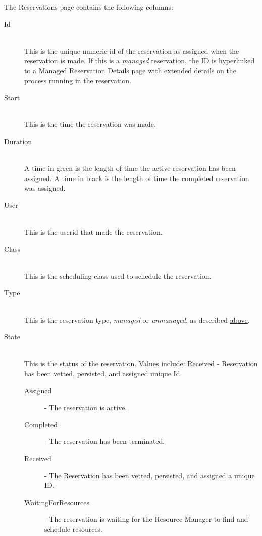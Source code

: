 The Reservations page contains the following columns: 
\begin{description}

\item[Id] \hfill \\
  This is the unique {\DUCC} numeric id of the reservation as assigned when the reservation is made.
  If this is a {\em managed} reservation, the ID is hyperlinked to a
  \hyperref[sec:ws-managed-reservation-details]{Managed Reservation Details} page with extended
  details on the process running in the reservation.

\item[Start] \hfill \\
  This is the time the reservation was made.
  
\item[Duration] \hfill \\
  A time in green is the length of time the active reservation has been assigned.  
  A time in black is the length of time the completed reservation was assigned. 
  
\item[User] \hfill \\
  This is the userid that made the reservation.
  
\item[Class] \hfill \\
  This is the scheduling class used to schedule the reservation.
  
\item[Type] \hfill \\
  This is the reservation type, {\em managed} or {\em unmanaged}, as described 
  \hyperref[sec:ws-reservations]{above}.

\item[State] \hfill \\
  This is the status of the reservation. Values include: Received - Reservation
  has been vetted, persisted, and assigned unique Id.
  \begin{description}
  \item[Assigned] - The reservation is active. 
  \item[Completed] - The reservation has been terminated.
  \item[Received] - The Reservation has been vetted, persisted, and assigned a unique ID.
  \item[WaitingForResources] - The reservation is waiting for the Resource Manager to find and 
    schedule resources. 
  \end{description}


\end{description}
